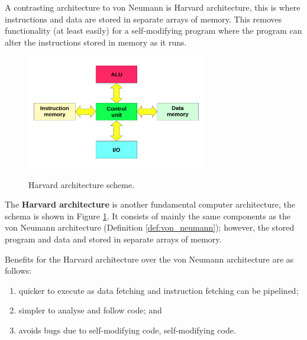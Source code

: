 A contrasting architecture to von Neumann is Harvard architecture, this is where instructions and data are stored in separate arrays of memory. This removes functionality (at least easily) for a self-modifying program where the program can alter the instructions stored in memory as it runs.

\begin{figure}
    \centering
    \includegraphics[width = 0.7\textwidth]{images/harvard.png}
    \label{fig:harvard}
    \caption{Harvard architecture scheme.}
\end{figure}

\begin{definition}
    The \textbf{Harvard architecture} is another fundamental computer architecture, the schema is shown in Figure \ref{fig:harvard}. It consists of mainly the same components as the von Neumann architecture (Definition \ref{def:von_neumann}); however, the stored program and data and stored in separate arrays of memory. 
\end{definition}

Benefits for the Harvard architecture over the von Neumann architecture are as follows:
\begin{enumerate}
    \item quicker to execute as data fetching and instruction fetching can be pipelined;
    \item simpler to analyse and follow code; and
    \item avoids bugs due to self-modifying code, self-modifying code.
\end{enumerate}

\begin{example}

\end{example}

\begin{example}

\end{example}

